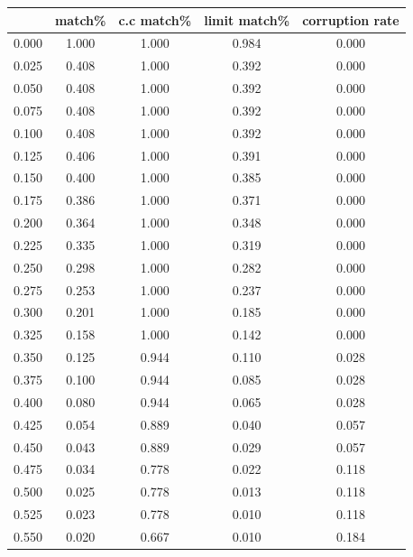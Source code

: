 \documentclass[epsfig,a4paper,11pt,titlepage,twoside,openany]{article}
\begin{document}
\begin{table}[H]
  \centering
  \begin{tabular}{
  >{\columncolor[HTML]{FFE599}}c 
  >{\columncolor[HTML]{B6D7A8}}c 
  >{\columncolor[HTML]{9FC5E8}}c 
  >{\columncolor[HTML]{F9CB9C}}c 
  >{\columncolor[HTML]{D9D2E9}}c }
  \cline{1-1}
  \multicolumn{1}{|c|}{\cellcolor[HTML]{F1C232}threshold} &
    \cellcolor[HTML]{6AA84F}match\% &
    \cellcolor[HTML]{3C78D8}c.c match\% &
    \cellcolor[HTML]{E69138}limit match\% &
    \cellcolor[HTML]{8E7CC3}corruption rate \\ \cline{1-1}
  0.000 & 1.000 & 1.000 & 0.984 & 0.000 \\
  0.025 & 0.408 & 1.000 & 0.392 & 0.000 \\
  0.050 & 0.408 & 1.000 & 0.392 & 0.000 \\
  0.075 & 0.408 & 1.000 & 0.392 & 0.000 \\
  0.100 & 0.408 & 1.000 & 0.392 & 0.000 \\
  0.125 & 0.406 & 1.000 & 0.391 & 0.000 \\
  0.150 & 0.400 & 1.000 & 0.385 & 0.000 \\
  0.175 & 0.386 & 1.000 & 0.371 & 0.000 \\
  0.200 & 0.364 & 1.000 & 0.348 & 0.000 \\
  0.225 & 0.335 & 1.000 & 0.319 & 0.000 \\
  0.250 & 0.298 & 1.000 & 0.282 & 0.000 \\
  0.275 & 0.253 & 1.000 & 0.237 & 0.000 \\
  0.300 & 0.201 & 1.000 & 0.185 & 0.000 \\
  0.325 & 0.158 & 1.000 & 0.142 & 0.000 \\
  0.350 & 0.125 & 0.944 & 0.110 & 0.028 \\
  0.375 & 0.100 & 0.944 & 0.085 & 0.028 \\
  0.400 & 0.080 & 0.944 & 0.065 & 0.028 \\
  \cellcolor[HTML]{FF0000}0.425 &
    \cellcolor[HTML]{FF0000}0.054 &
    \cellcolor[HTML]{FF0000}0.889 &
    \cellcolor[HTML]{FF0000}0.040 &
    \cellcolor[HTML]{FF0000}0.057 \\
  0.450 & 0.043 & 0.889 & 0.029 & 0.057 \\
  0.475 & 0.034 & 0.778 & 0.022 & 0.118 \\
  0.500 & 0.025 & 0.778 & 0.013 & 0.118 \\
  0.525 & 0.023 & 0.778 & 0.010 & 0.118 \\
  0.550 & 0.020 & 0.667 & 0.010 & 0.184 \\

\end{tabular}
\end{table}
\end{document}
